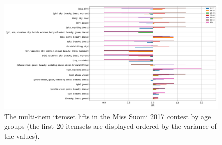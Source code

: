 \documentclass[english]{tktltiki}
\begin{document}
\clearpage
{}
\begin{figure}[h]
    \begin{center}
        \includegraphics[width=1.25\textwidth,center]{Images/itemset_lifts-age_groups-Miss_Suomi-multi_itemsets.png}
        The multi-item itemset lifts in the Miss Suomi 2017 contest by age groups (the first 20 itemsets are displayed ordered by the variance of the values).
    \end{center}
\end{figure}
\end{document}
